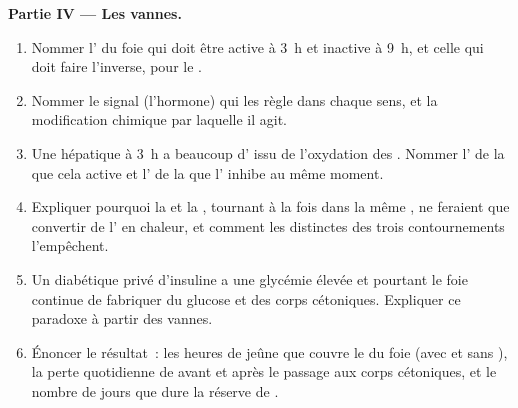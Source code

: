 \begin{problem}
\medskip
\noindent\textbf{Partie IV --- Les vannes.}
\begin{enumerate}[resume]
  \item Nommer l' du foie qui doit être active à 3~h et inactive à
        9~h, et celle qui doit faire l'inverse, pour le .
  \item Nommer le signal (l'hormone) qui les règle dans chaque sens, et
        la modification chimique par laquelle il agit.
  \item Une  hépatique à 3~h a beaucoup d' issu de
        l'oxydation des . Nommer l' de la 
        que cela active et l' de la  que l' inhibe au
        même moment.
  \item Expliquer pourquoi la  et la , tournant à
        la fois dans la même , ne feraient que convertir de l'
        en chaleur, et comment les  distinctes des trois
        contournements l'empêchent.
  \item Un diabétique privé d'insuline a une glycémie élevée et pourtant
        le foie continue de fabriquer du glucose et des corps
        cétoniques. Expliquer ce paradoxe à partir des vannes.
  \item Énoncer le résultat~: les heures de jeûne que couvre le
         du foie (avec et sans ), la perte
        quotidienne de  avant et après le passage aux corps
        cétoniques, et le nombre de jours que dure la réserve de
        .
\end{enumerate}
\end{problem}
